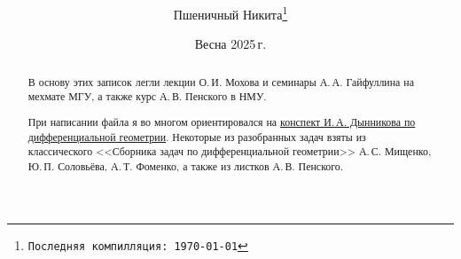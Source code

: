 \documentclass[a4paper, twoside, leqno, 11pt]{article}
\begin{document}
\title{\bfseries\scshape\course}
\date{Весна 2025\,г.}
\author{Пшеничный Никита\thanks{\texttt{Последняя компилляция: \today}}}

\maketitle
\begin{abstract}
	В основу этих записок легли лекции О.\,И. Мохова и семинары А.\,А. Гайфуллина на мехмате МГУ, а также курс А.\,В. Пенского в НМУ.

	При написании файла я во многом ориентировался на \href{https://teach-in.ru/file/methodical/pdf/classical-difgeom-dynnikov-M.pdf}{конспект И.\,А. Дынникова по дифференциальной геометрии}. Некоторые из разобранных задач взяты из классического <<Сборника задач по дифференциальной геометрии>> А.\,С. Мищенко, Ю.\,П. Соловьёва, А.\,Т. Фоменко, а также из листков А.\,В. Пенского.
\end{abstract}

\tableofcontents



\end{document}
